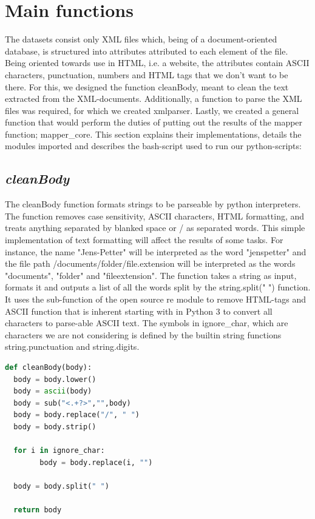\documentclass[fleqn,10pt]{wlscirep}
\begin{document}
\section{Main functions}
The datasets consist only XML files which, being of a document-oriented database, is structured into attributes attributed to each element of the file. Being oriented towards use in HTML, i.e. a website, the attributes contain ASCII characters, punctuation, numbers and HTML tags that we don't want to be there. For this, we designed the function cleanBody, meant to clean the text extracted from the XML-documents. Additionally, a function to parse the XML files was required, for which we created xmlparser. Lastly, we created a general function that would perform the duties of putting out the results of the mapper function; mapper\_core. This section explains their implementations, details the modules imported and describes the bash-script used to run our python-scripts: 
\subsection{\emph{cleanBody}}
The cleanBody function formats strings to be parseable by python interpreters. The function removes case sensitivity, ASCII characters, HTML formatting, and treats anything separated by blanked space or / as separated words. This simple implementation of text formatting will affect the results of some tasks. For instance, the name "Jens-Petter" will be interpreted as the word "jenspetter" and the file path /documents/folder/file.extension will be interpreted as the words "documents", "folder" and "fileextension".
The function takes a string as input, formats it and outputs a list of all the words split by the string.split(" ") function.
It uses the sub-function of the open source re module to remove HTML-tags and ASCII function that is inherent starting with in Python 3 to convert all characters to parse-able ASCII text. The symbols in ignore\_char, which are characters we are not considering is defined by the builtin string functions string.punctuation and string.digits.
\begin{lstlisting}[language=Python, caption=cleanBody function]
def cleanBody(body):
  body = body.lower()
  body = ascii(body)
  body = sub("<.+?>","",body)
  body = body.replace("/", " ")
  body = body.strip()

  for i in ignore_char:
    	body = body.replace(i, "")

  body = body.split(" ")

  return body
\end{lstlisting}
\end{document}
